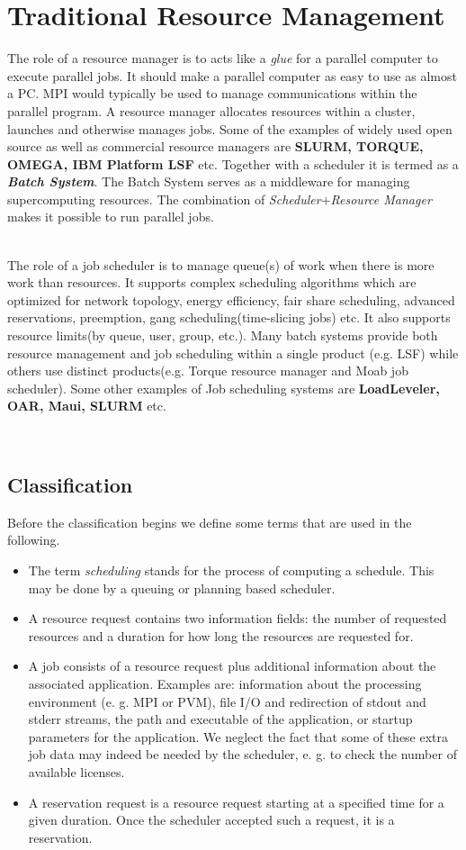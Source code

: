 \section{Traditional Resource Management}
The role of a resource manager is to acts like a \textit{glue} for a parallel computer to execute parallel jobs. It should make a parallel computer as easy to use as almost a PC. MPI would typically be used to manage communications within the parallel program. A resource manager allocates resources within a cluster, launches and otherwise manages jobs. Some of the examples of widely used open source as well as commercial resource managers are \textbf{SLURM, TORQUE, OMEGA, IBM Platform LSF} etc. Together with a scheduler it is termed as a \textbf{\textit{Batch System}}. The Batch System serves as a middleware for managing supercomputing resources. The combination of \textit{Scheduler}$+$\textit{Resource Manager} makes it possible to run parallel jobs.\par
\noindent
\\
The role of a job scheduler is to manage queue(s) of work when there is more work than resources. It supports complex scheduling algorithms which are optimized for network topology, energy efficiency, fair share scheduling, advanced reservations, preemption, gang scheduling(time-slicing jobs) etc. It also supports resource limits(by queue, user, group, etc.). Many batch systems provide both resource management and job scheduling within a single product (e.g. LSF) while others use distinct products(e.g. Torque resource manager and Moab job scheduler). Some other examples of Job scheduling systems are \textbf{LoadLeveler, OAR, Maui, SLURM} etc.\par
\noindent
\\
\subsection{Classification}
Before the classification begins we define some terms that are used in the following.
\begin{itemize}
\item The term \textit{scheduling} stands for the process of computing a schedule. This may be done by a queuing or planning based scheduler.
\item A resource request contains two information fields: the number of requested resources and a duration for how long the resources are requested for.
\item A job consists of a resource request plus additional information about the associated application. Examples are: information about the processing environment (e. g. MPI or PVM), file I/O and redirection of stdout and stderr streams, the path and executable of the application, or startup parameters for the application. We neglect the fact that some of these extra job data may indeed be needed by the scheduler, e. g. to check the number of available licenses.
\item A reservation request is a resource request starting at a specified time for a given duration. Once the scheduler accepted such a request, it is a reservation.
\end{itemize}

